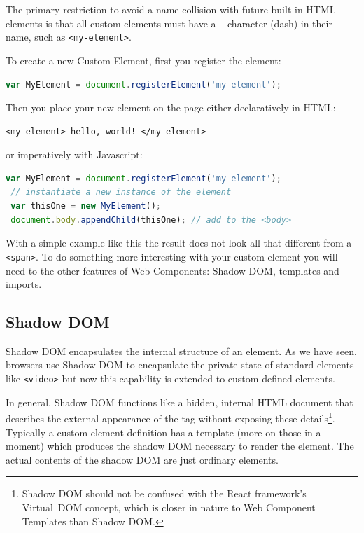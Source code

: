 The primary restriction to avoid a name collision with future built-in HTML elements is that all custom elements must have a \texttt{-} character (dash) in their name, such as \texttt{<my-element>}.

To create a new Custom Element, first you register the element:

\begin{lstlisting}[language=JavaScript]
 var MyElement = document.registerElement('my-element');
\end{lstlisting}

Then you place your new element on the page either declaratively in HTML:

\begin{lstlisting}[language=HTML5]
 <my-element> hello, world! </my-element>
\end{lstlisting}

or imperatively with Javascript:

\begin{lstlisting}[language=JavaScript]
 var MyElement = document.registerElement('my-element');
 // instantiate a new instance of the element
 var thisOne = new MyElement();      
 document.body.appendChild(thisOne); // add to the <body>
\end{lstlisting}


With a simple example like this the result does not look all that different from a \texttt{<span>}.
To do something more interesting with your custom element you will need to the other features of Web Components: Shadow DOM, templates and imports.

\subsection{Shadow DOM}
Shadow DOM encapsulates the internal structure of an element. 
As we have seen, browsers use Shadow DOM to encapsulate the private state of standard elements like \texttt{<video>} but now this capability is extended to custom-defined elements.

In general, Shadow DOM functions like a hidden, internal HTML document that describes the external appearance of the tag without exposing these details\footnote{
Shadow DOM should not be confused with the React framework's Virtual~DOM concept, which is closer in nature to Web Component Templates than Shadow DOM.
}. Typically a custom element definition has a template (more on those in a moment) which produces the shadow DOM necessary to render the element.
The actual contents of the shadow DOM are just ordinary elements.

